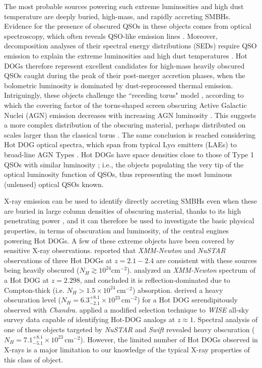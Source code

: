 \documentclass[useAMS,usenatbib]{mnras}
\newcommand*{\chandra}{\textit{Chandra}}
\newcommand*{\nhunits}{\mathrm{cm^{-2}}}
\begin{document}
The most probable sources powering such extreme luminosities and high dust temperature are deeply buried, high-mass, and rapidly accreting SMBHs. Evidence for the presence of obscured QSOs in these objects comes from optical spectroscopy, which often reveals QSO-like emission lines \citep{Eisenhardt12, Wu12,Tsai15, Stern14,Assef16}. Moreover, decomposition analyses of their spectral energy distributions (SEDs) require QSO emission to explain the extreme luminosities and high dust temperatures \citep{Assef15, Tsai15}. Hot DOGs therefore represent excellent candidates for high-mass heavily obscured QSOs caught during the peak of their post-merger accretion phases, when the bolometric luminosity is dominated by dust-reprocessed thermal emission. Intriguingly, these objects challenge the ``receding torus" model \citep[first suggested by][]{Lawrence91}, according to which the covering factor of the torus-shaped screen obscuring Active Galactic Nuclei (AGN) emission decreases with increasing AGN luminosity \citep[but see][]{Mateos17}. This suggests a more complex distribution of the obscuring material, perhaps distributed on scales larger than the classical torus \citep[e.g.,][]{Blecha17}. The same conclusion is reached considering Hot DOG optical spectra, which span from typical $\mathrm{Ly}\alpha$ emitters (LAEs) to broad-line AGN Types \citep{Eisenhardt12, Wu12,Tsai15, Stern14,Assef16}. Hot DOGs have space densities close to those of Type 1 QSOs with similar luminosity \citep{Assef15}; i.e., the objects populating the very tip of the optical luminosity function of QSOs, thus representing the most luminous (unlensed) optical QSOs known.

X-ray emission can be used to identify directly accreting SMBHs even when these are buried in large column densities of obscuring material, thanks to its high penetrating power \citep[e.g.,][]{Brandt15}, and it can therefore be used to investigate the basic physical properties, in terms of obscuration and luminosity, of the central engines powering Hot DOGs. A few of these extreme objects have been covered by sensitive X-ray observations. \cite{Stern14} reported that \textit{XMM-Newton} and \mbox{\textit{NuSTAR}} observations of three Hot DOGs at $z=2.1-2.4$ are consistent with these sources being heavily obscured ($N_H\gtrsim10^{24}\nhunits$). \cite{Piconcelli15} analyzed an \mbox{\textit{XMM-Newton}} spectrum of a Hot DOG at $z=2.298$, and concluded it is reflection-dominated due to Compton-thick (i.e. $N_H>1.5\times10^{24}\,\mathrm{cm^{-2}}$) absorption. \cite{Assef16} derived a heavy obscuration level ($N_H=6.3^{+8.1}_{-2.1}\times10^{23}\,\nhunits$) for a Hot DOG serendipitously observed with \chandra. \cite{RicciC17} applied a modified selection technique to \textit{WISE} all-sky survey data capable of identifying Hot-DOG  analogs at $z\approx1$. Spectral analysis of one of these objects targeted by \textit{NuSTAR} and \textit{Swift} revealed heavy obscuration ($N_H=7.1^{+8.1}_{-5.1}\times10^{23}\,\nhunits$).  However, the limited number of Hot DOGs observed in \mbox{X-rays} is a major limitation to our knowledge of the typical X-ray properties of this class of object.
\end{document}
